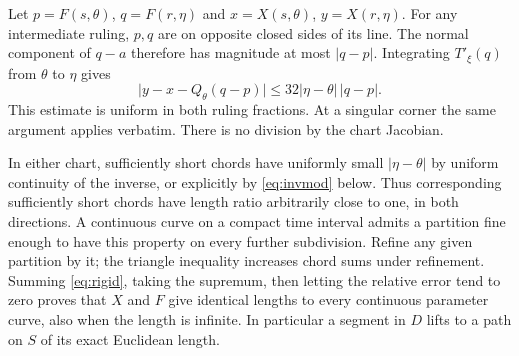 \documentclass[10pt,letterpaper]{article}
\newcommand{\chapterpage}{\clearpage}
\begin{document}
\chapterpage
Let $p=F(s,\theta)$, $q=F(r,\eta)$ and $x=X(s,\theta)$, $y=X(r,\eta)$. For any intermediate ruling, $p,q$ are on opposite closed sides of its line. The normal component of $q-a$ therefore has magnitude at most $|q-p|$. Integrating $T'_\xi(q)$ from $\theta$ to $\eta$ gives
\begin{equation}
 \big|y-x-Q_\theta(q-p)\big|\le32|\eta-\theta|\,|q-p| .
 \label{eq:rigid}
\end{equation}
This estimate is uniform in both ruling fractions. At a singular corner the same argument applies verbatim. There is no division by the chart Jacobian.
\par In either chart, sufficiently short chords have uniformly small $|\eta-\theta|$ by uniform continuity of the inverse, or explicitly by \eqref{eq:invmod} below. Thus corresponding sufficiently short chords have length ratio arbitrarily close to one, in both directions. A continuous curve on a compact time interval admits a partition fine enough to have this property on every further subdivision. Refine any given partition by it; the triangle inequality increases chord sums under refinement. Summing \eqref{eq:rigid}, taking the supremum, then letting the relative error tend to zero proves that $X$ and $F$ give identical lengths to every continuous parameter curve, also when the length is infinite. In particular a segment in $D$ lifts to a path on $S$ of its exact Euclidean length.
\end{document}
